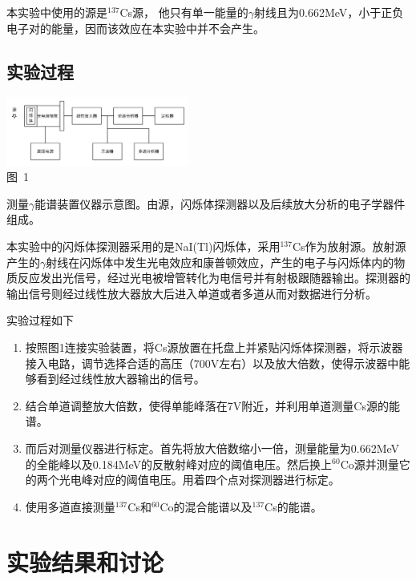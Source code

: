 \documentclass[a4paper,10.0pt,twoside]{npr}
\begin{document}
\begin{multicols}{2}
本实验中使用的源是$^{137}$Cs源， 他只有单一能量的$\gamma$射线且为0.662MeV，小于正负电子对的能量，因而该效应在本实验中并不会产生。

\subsection{实验过程}

\begin{center}
   \includegraphics[width=0.45\textwidth]{tu1.png}
\\
\xiaowu\song 图~1\begin{minipage}[t]{75mm} \quad 测量$\gamma$能谱装置仪器示意图。由源，闪烁体探测器以及后续放大分析的电子学器件组成。\\[-1mm]\wuhao
\end{minipage}
\end{center}

本实验中的闪烁体探测器采用的是NaI(Tl)闪烁体，采用$^{137}$Cs作为放射源。放射源产生的$\gamma$射线在闪烁体中发生光电效应和康普顿效应，产生的电子与闪烁体内的物质反应发出光信号，经过光电被增管转化为电信号并有射极跟随器输出。探测器的输出信号则经过线性放大器放大后进入单道或者多道从而对数据进行分析。

实验过程如下
\begin{enumerate}
\item 按照图1连接实验装置，将Cs源放置在托盘上并紧贴闪烁体探测器，将示波器接入电路，调节选择合适的高压（700V左右）以及放大倍数，使得示波器中能够看到经过线性放大器输出的信号。
\item 结合单道调整放大倍数，使得单能峰落在7V附近，并利用单道测量Cs源的能谱。
\item 而后对测量仪器进行标定。首先将放大倍数缩小一倍，测量能量为0.662MeV的全能峰以及0.184MeV的反散射峰对应的阈值电压。然后换上$^{60}$Co源并测量它的两个光电峰对应的阈值电压。用着四个点对探测器进行标定。
\item 使用多道直接测量$^{137}$Cs和$^{60}$Co的混合能谱以及$^{137}$Cs的能谱。
\end{enumerate}


\section{实验结果和讨论}


\end{multicols}
\end{document}
